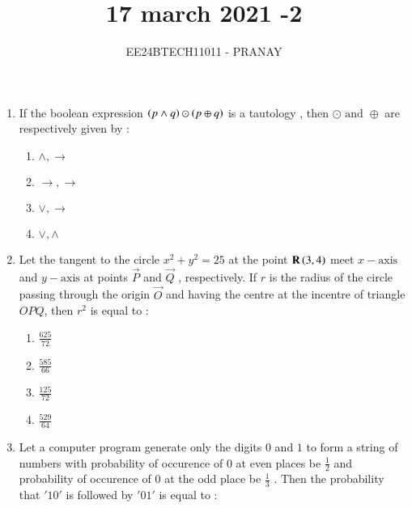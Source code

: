 \documentclass[journal,12pt,onecolumn]{IEEEtran}
\theoremstyle{remark}
\begin{document}

\vspace{3cm}

\title{17 march 2021 -2}
\author{EE24BTECH11011 - PRANAY}
\maketitle

\bigskip

\renewcommand{\thefigure}{\theenumi}
\renewcommand{\thetable}{\theenumi}
\begin{enumerate}
    \item If the boolean expression $\left(p \land q\right) \odot \left(p \oplus q\right)$ is a tautology , then $\odot  \text{ and }  \oplus$ are respectively given by :
    \begin{multicols}{2}
    \begin{enumerate}
        \item $\land , \rightarrow$
        \item $\rightarrow , \rightarrow$
        \item $ \lor , \rightarrow$
        \item $ \lor , \land$
    \end{enumerate}
    \end{multicols}
    \item Let the tangent to the circle $x^2 + y^2 = 25$ at the point $\mathbf{R}\left(3,4\right)$ meet $x-\text{axis}$ and $y-\text{axis}$ at points $\vec{P}$ and $\vec{Q}$ , respectively. If $r$ is the radius of the circle passing through the origin $\vec{O}$ and having the centre at the incentre of triangle $OPQ$, then $r^2$ is equal to :
    \begin{multicols}{2}
    \begin{enumerate}
        \item $\frac{625}{72}$\\
        \item $\frac{585}{66}$
        \item $\frac{125}{72}$\\
        \item $\frac{529}{64}$
    \end{enumerate}
    \end{multicols}
    \item Let a computer program generate only the digits $0$ and $1$ to form a string of numbers with probability of occurence of $0$ at even places be $\frac{1}{2}$ and probability of occurence of $0$ at the odd place be $\frac{1}{3}$ . Then the probability that $'10'$ is followed by $'01'$ is equal to :

\end{enumerate}
\end{document}
